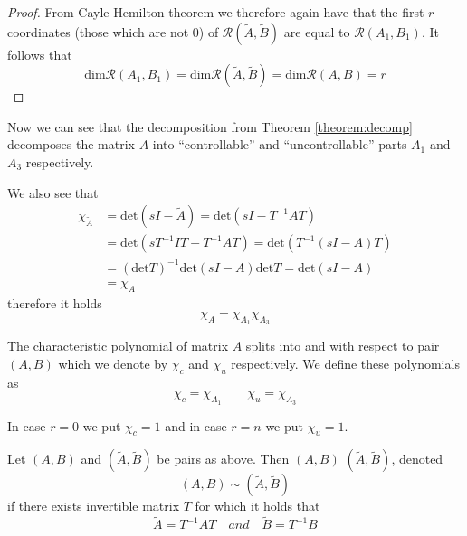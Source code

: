 \begin{proof}
	From Cayle-Hemilton theorem we therefore again have that the first $r$ coordinates (those which are not 0) of $\mathcal{R}(\widetilde{A},\widetilde{B})$ are equal to $\mathcal{R}(A_1,B_1)$. It follows that $$\text{dim}\mathcal{R}(A_1,B_1)=\text{dim}\mathcal{R}(\widetilde{A},\widetilde{B})=\text{dim}\mathcal{R}(A,B)=r$$
\end{proof}

Now we can see that the decomposition from Theorem \ref{theorem:decomp} decomposes the matrix $A$ into ``controllable'' and ``uncontrollable'' parts $A_1$ and $A_3$ respectively.

We also see that 
\begin{align*}
	\chi_{\widetilde{A}}&=\text{det}(sI-\widetilde{A})=\text{det}(sI-T^{-1}AT) \\
	&=\text{det}(sT^{-1}IT-T^{-1}AT)=\text{det}(T^{-1}(sI-A)T) \\
	&=(\text{det}T)^{-1}\text{det}(sI-A)\text{det}T=\text{det}(sI-A) \\
	&=\chi_A
\end{align*}
therefore it holds $$\chi_A=\chi_{A_1}\chi_{A_3}$$ 

\begin{definition}
	The characteristic polynomial of matrix $A$ splits into  and  with respect to pair $(A,B)$ which we denote by $\chi_c$ and $\chi_u$ respectively. We define these polynomials as $$\chi_c=\chi_{A_1} \qquad \chi_u=\chi_{A_3}$$

	In case $r=0$ we put $\chi_c=1$ and in case $r=n$ we put $\chi_u=1$.
\end{definition}

\begin{definition}
	Let $(A,B)$ and $(\widetilde{A},\widetilde{B})$ be pairs as above. Then $(A,B)$  $(\widetilde{A},\widetilde{B})$, denoted $$(A,B) \sim (\widetilde{A},\widetilde{B})$$ if there exists invertible matrix $T$ for which it holds that $$\widetilde{A}=T^{-1}AT\quad and\quad\widetilde{B}=T^{-1}B$$
\end{definition}